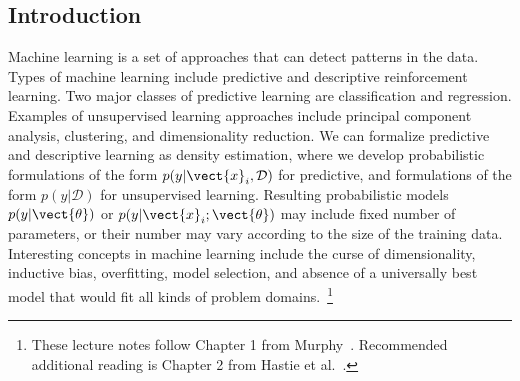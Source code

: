 \begin{refsection}
\chapter{Introduction}

\begin{summary}
Machine learning is a set of approaches that can detect patterns in the data. Types of machine learning include predictive and descriptive reinforcement learning. Two major classes of predictive learning are classification and regression. Examples of unsupervised learning approaches include principal component analysis, clustering, and dimensionality reduction. We can formalize predictive and descriptive learning as density estimation, where we develop probabilistic formulations of the form $p(y|\vect{x}_i,\mathcal{D})$ for predictive, and formulations of the form $p(y|\mathcal{D})$ for unsupervised learning. Resulting probabilistic models $p(y|\vect{\theta})$ or $p(y|\vect{x}_i; \vect{\theta})$ may include fixed number of parameters, or their number may vary according to the size of the training data. Interesting concepts in machine learning include the curse of dimensionality, inductive bias, overfitting, model selection, and absence of a universally best model that would fit all kinds of problem domains.~\footnote{These lecture notes follow Chapter 1 from Murphy~\cite{2012-Murphy}. Recommended additional reading is Chapter 2 from Hastie et al.~\cite{2016-Hastie}.}
\end{summary}



\end{refsection}

